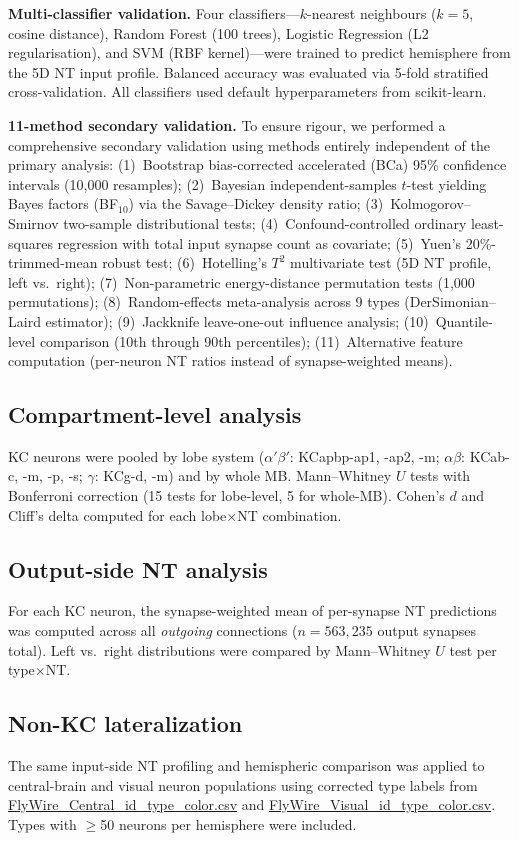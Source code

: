 \documentclass[10pt]{article}
\begin{document}
\textbf{Multi-classifier validation.} Four classifiers---$k$-nearest neighbours ($k = 5$, cosine distance), Random Forest (100 trees), Logistic Regression (L2 regularisation), and SVM (RBF kernel)---were trained to predict hemisphere from the 5D NT input profile. Balanced accuracy was evaluated via 5-fold stratified cross-validation. All classifiers used default hyperparameters from scikit-learn.

\textbf{11-method secondary validation.} To ensure rigour, we performed a comprehensive secondary validation using methods entirely independent of the primary analysis: (1)~Bootstrap bias-corrected accelerated (BCa) 95\% confidence intervals (10,000 resamples); (2)~Bayesian independent-samples $t$-test yielding Bayes factors (BF$_{10}$) via the Savage--Dickey density ratio; (3)~Kolmogorov--Smirnov two-sample distributional tests; (4)~Confound-controlled ordinary least-squares regression with total input synapse count as covariate; (5)~Yuen's 20\%-trimmed-mean robust test; (6)~Hotelling's $T^2$ multivariate test (5D NT profile, left vs.\ right); (7)~Non-parametric energy-distance permutation tests (1,000 permutations); (8)~Random-effects meta-analysis across 9 types (DerSimonian--Laird estimator); (9)~Jackknife leave-one-out influence analysis; (10)~Quantile-level comparison (10th through 90th percentiles); (11)~Alternative feature computation (per-neuron NT ratios instead of synapse-weighted means).

\subsection*{Compartment-level analysis}
KC neurons were pooled by lobe system ($\alpha'\beta'$: KCapbp-ap1, -ap2, -m; $\alpha\beta$: KCab-c, -m, -p, -s; $\gamma$: KCg-d, -m) and by whole MB. Mann--Whitney $U$ tests with Bonferroni correction (15 tests for lobe-level, 5 for whole-MB). Cohen's $d$ and Cliff's delta computed for each lobe$\times$NT combination.

\subsection*{Output-side NT analysis}
For each KC neuron, the synapse-weighted mean of per-synapse NT predictions was computed across all \textit{outgoing} connections ($n = 563{,}235$ output synapses total). Left vs.\ right distributions were compared by Mann--Whitney $U$ test per type$\times$NT.

\subsection*{Non-KC lateralization}
The same input-side NT profiling and hemispheric comparison was applied to central-brain and visual neuron populations using corrected type labels from \url{FlyWire_Central_id_type_color.csv} and \url{FlyWire_Visual_id_type_color.csv}. Types with $\geq$50 neurons per hemisphere were included.
\end{document}
